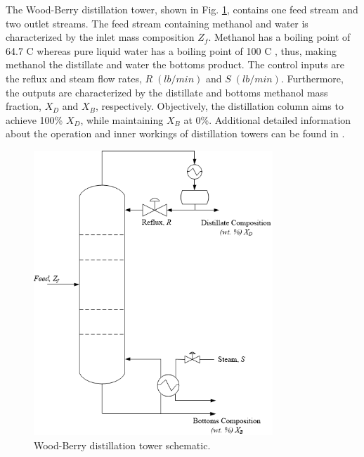 The Wood-Berry distillation tower, shown in Fig. \ref{fig:woodberry}, contains one feed stream and two outlet streams. The feed stream containing methanol and water is characterized by the inlet mass composition $Z_f$. Methanol has a boiling point of 64.7 \textdegree C whereas pure liquid water has a boiling point of 100 \textdegree C \cite{sonntag_thermo}, thus, making methanol the distillate and water the bottoms product. The control inputs are the reflux and steam flow rates, $R \; (lb/min)$ and $S \; (lb/min)$. Furthermore, the outputs are characterized by the distillate and bottoms methanol mass fraction, $X_D$ and $X_B$, respectively. Objectively, the distillation column aims to achieve 100\% $X_D$, while maintaining $X_B$ at 0\%. Additional detailed information about the operation and inner workings of distillation towers can be found in \cite{henry_distillation}.  
\begin{figure}[H]
    \begin{center}
        \includegraphics[width=9cm]{images/ftc/woodberry.png}
        \caption{\label{fig:woodberry} Wood-Berry distillation tower schematic.}
    \end{center}
\end{figure}

